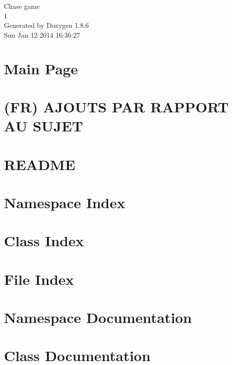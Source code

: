 \documentclass[twoside]{book}
\newcommand{\clearemptydoublepage}{%
  \newpage{\pagestyle{empty}\cleardoublepage}%
}
\begin{document}
\hypersetup{pageanchor=false}
\begin{titlepage}
\vspace*{7cm}
\begin{center}%
{\Large Chase game \\[1ex]\large 1 }\\
\vspace*{1cm}
{\large Generated by Doxygen 1.8.6}\\
\vspace*{0.5cm}
{\small Sun Jan 12 2014 16:36:27}\\
\end{center}
\end{titlepage}
\clearemptydoublepage
\tableofcontents
\clearemptydoublepage
{}
\hypersetup{pageanchor=true}

\chapter{Main Page}
\label{index}\hypertarget{index}{}
\chapter{(F\-R) A\-J\-O\-U\-T\-S P\-A\-R R\-A\-P\-P\-O\-R\-T A\-U S\-U\-J\-E\-T}
\label{md__c_h_a_n_g_e_s}
\hypertarget{md__c_h_a_n_g_e_s}{}

\chapter{R\-E\-A\-D\-M\-E}
\label{md__r_e_a_d_m_e}
\hypertarget{md__r_e_a_d_m_e}{}

\chapter{Namespace Index}

\chapter{Class Index}

\chapter{File Index}

\chapter{Namespace Documentation}

\chapter{Class Documentation}







\end{document}
